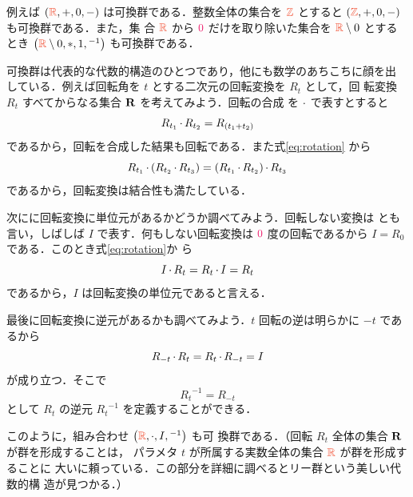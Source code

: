 \documentclass[a5paper,twoside,fleqn,draft]{jsbook}
\begin{document}
例えば $\mTupleWith{\mRSet,+,0,-}$ は可換群である．整数全体の集合を
$\mZSet$ とすると $\mTupleWith{\mZSet,+,0,-}$ も可換群である．また，集
合 $\mRSet$ から $\hConstant{0}$ だけを取り除いた集合を $\mRSet\setminus0$ とする
とき $\mTupleWith{\mRSet\setminus0,*,1,{}^{-1}}$ も可換群である．

可換群は代表的な代数的構造のひとつであり，他にも数学のあちこちに顔を出
している．例えば回転角を $t$ とする二次元の回転変換を $R_t$ として，回
転変換 $R_t$ すべてからなる集合 $\mathbf{R}$ を考えてみよう．回転の合成
を $\operatorname{\cdot}$ で表すとすると
\begin{equation}
\label{eq:rotation}
R_{t_1}\operatorname{\cdot} R_{t_2}=R_{(t_1+t_2)}
\end{equation}
であるから，回転を合成した結果も回転である．また式\eqref{eq:rotation}
から
\begin{equation}
  R_{t_1}\operatorname{\cdot}\left(R_{t_2}\operatorname{\cdot} R_{t_3}\right)
  =\left(R_{t_1}\operatorname{\cdot} R_{t_2}\right)\operatorname{\cdot} R_{t_3}
\end{equation}
であるから，回転変換は結合性も満たしている．

次にに回転変換に単位元があるかどうか調べてみよう．回転しない変換は
とも言い，しばしば $I$ で表す．何もしない回転変換は
$\hConstant{0}$ 度の回転であるから $I=R_0$ である．このとき式\eqref{eq:rotation}か
ら
\begin{equation}
I\operatorname{\cdot} R_t=R_t\operatorname{\cdot} I=R_t
\end{equation}
であるから，$I$ は回転変換の単位元であると言える．

最後に回転変換に逆元があるかも調べてみよう．$t$ 回転の逆は明らかに
$-t$ であるから
\begin{equation}
R_{-t}\operatorname{\cdot} R_t=R_t\operatorname{\cdot} R_{-t}=I
\end{equation}
が成り立つ．そこで
\begin{equation}
{R_t}^{-1}=R_{-t}
\end{equation}
として $R_t$ の逆元 ${R_t}^{-1}$ を定義することができる．

このように，組み合わせ $\mTupleWith{\mRSet,\mCompRot,I,{}^{-1}}$ も可
換群である．（回転 $R_t$ 全体の集合 $\mathbf{R}$ が群を形成することは，
パラメタ $t$ が所属する実数全体の集合 $\mRSet$ が群を形成することに
大いに頼っている．この部分を詳細に調べるとリー群という美しい代数的構
造が見つかる．）
\end{document}

